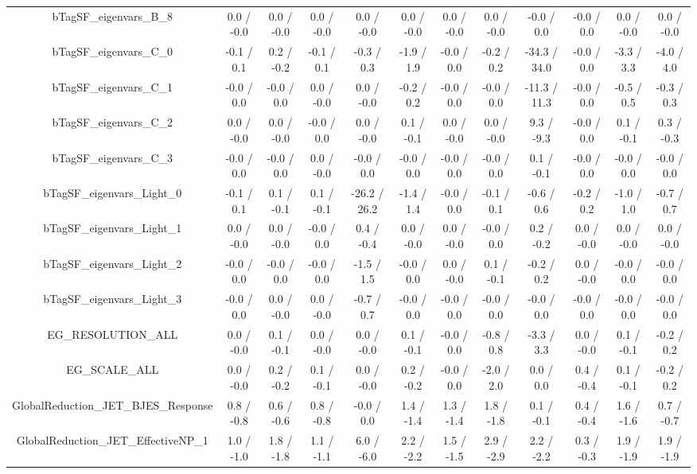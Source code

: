 \begin{table}[htbp]
\begin{center}
\begin{tabular}{|c|c|c|c|c|c|c|c|c|c|c|c|}
  bTagSF_eigenvars_B_8 & 0.0 / -0.0 & 0.0 / -0.0 & 0.0 / -0.0 & 0.0 / -0.0 & 0.0 / -0.0 & 0.0 / -0.0 & 0.0 / -0.0 & -0.0 / 0.0 & -0.0 / 0.0 & 0.0 / -0.0 & 0.0 / -0.0 \\ 
  bTagSF_eigenvars_C_0 & -0.1 / 0.1 & 0.2 / -0.2 & -0.1 / 0.1 & -0.3 / 0.3 & -1.9 / 1.9 & -0.0 / 0.0 & -0.2 / 0.2 & -34.3 / 34.0 & -0.0 / 0.0 & -3.3 / 3.3 & -4.0 / 4.0 \\ 
  bTagSF_eigenvars_C_1 & -0.0 / 0.0 & -0.0 / 0.0 & 0.0 / -0.0 & 0.0 / -0.0 & -0.2 / 0.2 & -0.0 / 0.0 & -0.0 / 0.0 & -11.3 / 11.3 & -0.0 / 0.0 & -0.5 / 0.5 & -0.3 / 0.3 \\ 
  bTagSF_eigenvars_C_2 & 0.0 / -0.0 & 0.0 / -0.0 & -0.0 / 0.0 & 0.0 / -0.0 & 0.1 / -0.1 & 0.0 / -0.0 & 0.0 / -0.0 & 9.3 / -9.3 & -0.0 / 0.0 & 0.1 / -0.1 & 0.3 / -0.3 \\ 
  bTagSF_eigenvars_C_3 & -0.0 / 0.0 & -0.0 / 0.0 & 0.0 / -0.0 & -0.0 / 0.0 & -0.0 / 0.0 & -0.0 / 0.0 & -0.0 / 0.0 & 0.1 / -0.1 & -0.0 / 0.0 & -0.0 / 0.0 & -0.0 / 0.0 \\ 
  bTagSF_eigenvars_Light_0 & -0.1 / 0.1 & 0.1 / -0.1 & 0.1 / -0.1 & -26.2 / 26.2 & -1.4 / 1.4 & -0.0 / 0.0 & -0.1 / 0.1 & -0.6 / 0.6 & -0.2 / 0.2 & -1.0 / 1.0 & -0.7 / 0.7 \\ 
  bTagSF_eigenvars_Light_1 & 0.0 / -0.0 & 0.0 / -0.0 & -0.0 / 0.0 & 0.4 / -0.4 & 0.0 / -0.0 & 0.0 / -0.0 & -0.0 / 0.0 & 0.2 / -0.2 & 0.0 / -0.0 & 0.0 / -0.0 & 0.0 / -0.0 \\ 
  bTagSF_eigenvars_Light_2 & -0.0 / 0.0 & -0.0 / 0.0 & -0.0 / 0.0 & -1.5 / 1.5 & -0.0 / 0.0 & 0.0 / -0.0 & 0.1 / -0.1 & -0.2 / 0.2 & 0.0 / -0.0 & -0.0 / 0.0 & -0.0 / 0.0 \\ 
  bTagSF_eigenvars_Light_3 & -0.0 / 0.0 & 0.0 / -0.0 & 0.0 / -0.0 & -0.7 / 0.7 & -0.0 / 0.0 & -0.0 / 0.0 & -0.0 / 0.0 & -0.0 / 0.0 & -0.0 / 0.0 & -0.0 / 0.0 & -0.0 / 0.0 \\ 
  EG_RESOLUTION_ALL & 0.0 / -0.0 & 0.1 / -0.1 & 0.0 / -0.0 & 0.0 / -0.0 & 0.1 / -0.1 & -0.0 / 0.0 & -0.8 / 0.8 & -3.3 / 3.3 & 0.0 / -0.0 & 0.1 / -0.1 & -0.2 / 0.2 \\ 
  EG_SCALE_ALL & 0.0 / -0.0 & 0.2 / -0.2 & 0.1 / -0.1 & 0.0 / -0.0 & 0.2 / -0.2 & -0.0 / 0.0 & -2.0 / 2.0 & 0.0 / 0.0 & 0.4 / -0.4 & 0.1 / -0.1 & -0.2 / 0.2 \\ 
  GlobalReduction_JET_BJES_Response & 0.8 / -0.8 & 0.6 / -0.6 & 0.8 / -0.8 & -0.0 / 0.0 & 1.4 / -1.4 & 1.3 / -1.4 & 1.8 / -1.8 & 0.1 / -0.1 & 0.4 / -0.4 & 1.6 / -1.6 & 0.7 / -0.7 \\ 
  GlobalReduction_JET_EffectiveNP_1 & 1.0 / -1.0 & 1.8 / -1.8 & 1.1 / -1.1 & 6.0 / -6.0 & 2.2 / -2.2 & 1.5 / -1.5 & 2.9 / -2.9 & 2.2 / -2.2 & 0.3 / -0.3 & 1.9 / -1.9 & 1.9 / -1.9 \\ 

\end{tabular}
\end{center}
\end{table}
